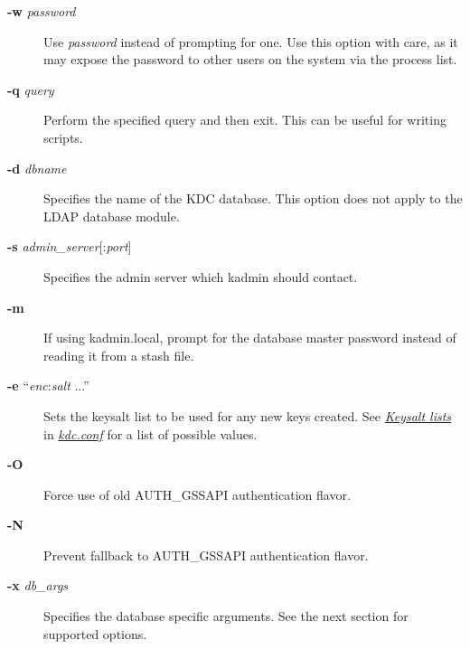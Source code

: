 \documentclass[letterpaper,10pt,english]{sphinxmanual}
\begin{document}
\begin{description}
\item[{\textbf{-w} \emph{password}}] \leavevmode
Use \emph{password} instead of prompting for one.  Use this option with
care, as it may expose the password to other users on the system
via the process list.

\item[{\textbf{-q} \emph{query}}] \leavevmode
Perform the specified query and then exit.  This can be useful for
writing scripts.

\item[{\textbf{-d} \emph{dbname}}] \leavevmode
Specifies the name of the KDC database.  This option does not
apply to the LDAP database module.

\item[{\textbf{-s} \emph{admin\_server}{[}:\emph{port}{]}}] \leavevmode
Specifies the admin server which kadmin should contact.

\item[{\textbf{-m}}] \leavevmode
If using kadmin.local, prompt for the database master password
instead of reading it from a stash file.

\item[{\textbf{-e} ``\emph{enc}:\emph{salt} ...''}] \leavevmode
Sets the keysalt list to be used for any new keys created.  See
{\hyperref[admin/conf_files/kdc_conf:keysalt-lists]{\emph{Keysalt lists}}} in {\hyperref[admin/conf_files/kdc_conf:kdc-conf-5]{\emph{kdc.conf}}} for a list of possible
values.

\item[{\textbf{-O}}] \leavevmode
Force use of old AUTH\_GSSAPI authentication flavor.

\item[{\textbf{-N}}] \leavevmode
Prevent fallback to AUTH\_GSSAPI authentication flavor.

\item[{\textbf{-x} \emph{db\_args}}] \leavevmode
Specifies the database specific arguments.  See the next section
for supported options.

\end{description}
\label{admin/admin_commands/kadmin_local:kadmin-options-end}
\end{document}
